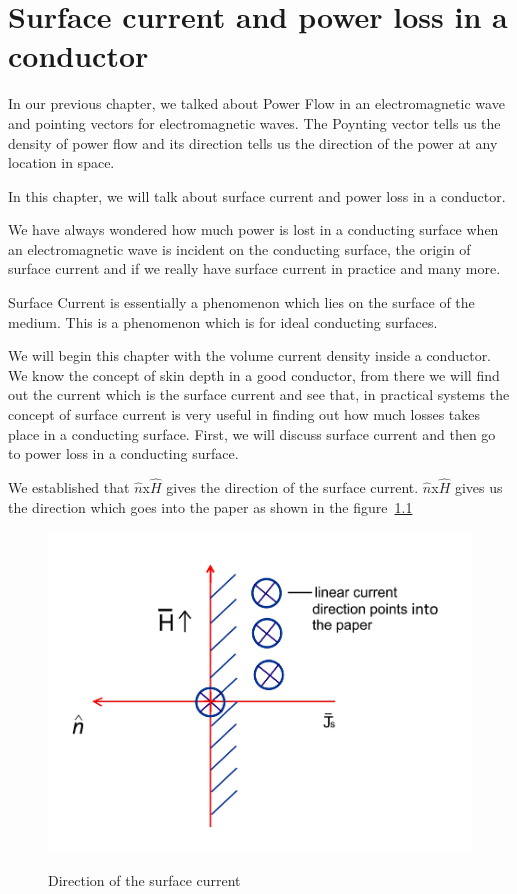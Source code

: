 \chapter{Surface current and power loss in a conductor}\label{lec:lec28}
In our previous chapter, we talked about Power Flow in an electromagnetic wave and pointing vectors for electromagnetic waves. The Poynting vector tells us the density of power flow and its direction tells us the direction of the power at any location in space.

In this chapter, we will talk about surface current and power loss in a conductor.

We have always wondered how much power is lost in a conducting surface when an electromagnetic wave is incident on the conducting surface, the origin of surface current and if we really have surface current in practice and many more.

Surface Current is essentially a phenomenon which lies on the surface of the medium. This is a phenomenon which is for ideal conducting surfaces.

We will begin this chapter with the volume current density inside a conductor. We know the concept of skin depth in a good conductor, from there we will find out the current which is the surface current and see that, in practical systems the concept of surface current is very useful in finding out how much losses takes place in a conducting surface. First, we will discuss surface current and then go to power loss in a conducting surface.

We established that $\hat{n}$x$\hat{H}$ gives the direction of the surface current. $\hat{n}$x$\hat{H}$ gives us the direction which goes into the paper as shown in the figure~\ref{fig:direction_of_surface_current}
\begin{figure}[h]
\centering
\textsc{\includegraphics[width=1\linewidth]{./graphics/surface_current_direction}}
\caption{Direction of the surface current}
\label{fig:direction_of_surface_current}
\end{figure}

